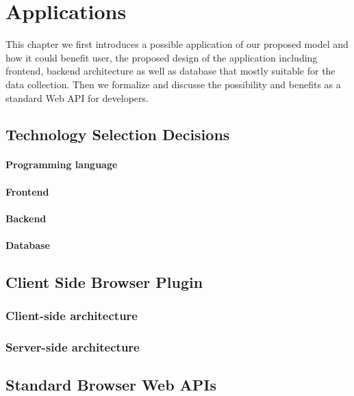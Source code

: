 \section{Applications}
\label{ch:app}

This chapter we first introduces a possible application of our proposed model
and how it could benefit user, the proposed design of the application including frontend, backend architecture as well as database that mostly suitable for the data collection.
Then we formalize and discusse the possibility and benefits as a standard Web API for developers.

\subsection{Technology Selection Decisions}

\paragraph{Programming language} 

\paragraph{Frontend} 

\paragraph{Backend}

\paragraph{Database}


\subsection{Client Side Browser Plugin}

\subsubsection{Client-side architecture}

\subsubsection{Server-side architecture}

\subsection{Standard Browser Web APIs}

